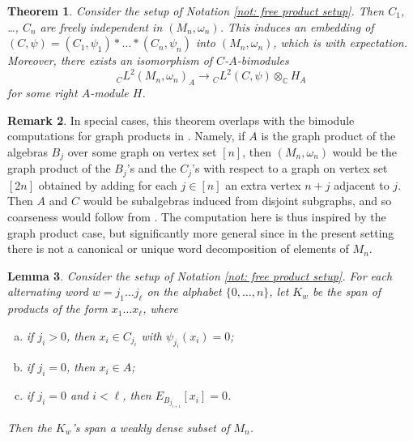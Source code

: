 \documentclass[10pt]{amsart}
\numberwithin{equation}{section}
\newtheorem{thm}{Theorem}[section]
\newtheorem{lem}[thm]{Lemma}
\theoremstyle{definition}
\newtheorem{remark}[thm]{Remark}
\begin{document}
\begin{thm} \label{thm: coarseness 1}
	Consider the setup of Notation \ref{not: free product setup}.  Then $C_1$, \dots, $C_n$ are freely independent in $(M_n,\omega_n)$.  This induces an embedding of $(C,\psi) = (C_1,\psi_1) * \dots * (C_n,\psi_n)$ into $(M_n,\omega_n)$, which is with expectation.  Moreover, there exists an isomorphism of $C$-$A$-bimodules
	\[
	{}_C L^2(M_n,\omega_n)_A \to {}_C L^2(C,\psi) \otimes_{\mathbb{C}} H_{A}
	\]
	for some right $A$-module $H$.
\end{thm}

\begin{remark}
In special cases, this theorem overlaps with the bimodule computations for graph products in \cite[\S 5]{charlesworth2023strong2}.  Namely, if $A$ is the graph product of the algebras $B_j$ over some graph on vertex set $[n]$, then $(M_n,\omega_n)$ would be the graph product of the $B_j$'s and the $C_j$'s with respect to a graph on vertex set $[2n]$ obtained by adding for each $j \in [n]$ an extra vertex $n+j$ adjacent to $j$.  Then $A$ and $C$ would be subalgebras induced from disjoint subgraphs, and so coarseness would follow from  \cite[Theorem 5.4]{charlesworth2023strong2}.  The computation here is thus inspired by the graph product case, but significantly more general since in the present setting there is not a canonical or unique word decomposition of elements of $M_n$.
\end{remark}

\begin{lem} \label{lem: word decomposition}
	Consider the setup of Notation \ref{not: free product setup}.  For each alternating word $w = j_1 \dots j_\ell$ on the alphabet $\{0,\dots,n\}$, let $K_w$ be the span of products of the form $x_1 \dots x_\ell$, where
	\begin{enumerate}[(a)]
		\item if $j_i > 0$, then $x_i \in C_{j_i}$ with $\psi_{j_i}(x_i) = 0$;
		\item if $j_i = 0$, then $x_i \in A$;
		\item if $j_i = 0$ and $i < \ell$, then $E_{B_{j_{i+1}}}[x_i] = 0$.
	\end{enumerate}
	Then the $K_w$'s span a weakly dense subset of $M_n$.
\end{lem}
\end{document}
